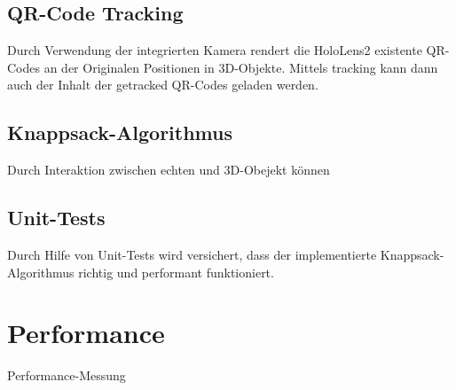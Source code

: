 \subsection{QR-Code Tracking}
Durch Verwendung der integrierten Kamera rendert die HoloLens2 existente QR-Codes an
der Originalen Positionen in 3D-Objekte. Mittels tracking kann dann auch der Inhalt
der getracked QR-Codes geladen werden.

\subsection{Knappsack-Algorithmus}
Durch Interaktion zwischen echten und 3D-Obejekt können

\subsection{Unit-Tests}
Durch Hilfe von Unit-Tests wird versichert, dass der implementierte Knappsack-Algorithmus
richtig und performant funktioniert.

\section{Performance}
Performance-Messung


